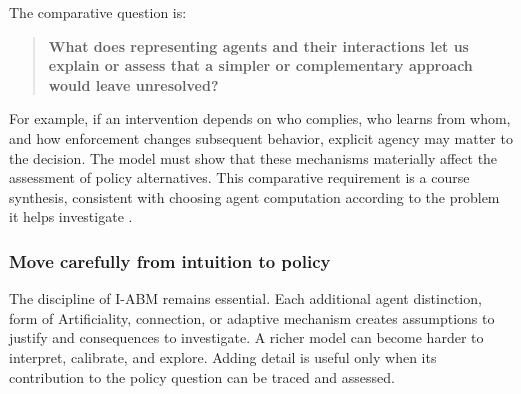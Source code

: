 \documentclass[11pt,a4paper]{article}
\begin{document}
The comparative question is:
\begin{quote}
\textbf{What does representing agents and their interactions let us explain or assess that a simpler or complementary approach would leave unresolved?}
\end{quote}

For example, if an intervention depends on who complies, who learns from whom, and how enforcement changes subsequent behavior, explicit agency may matter to the decision. The model must show that these mechanisms materially affect the assessment of policy alternatives. This comparative requirement is a course synthesis, consistent with choosing agent computation according to the problem it helps investigate \cite{axtell_why_2000-1}.

\subsubsection{Move carefully from intuition to policy}

The discipline of I-ABM remains essential. Each additional agent distinction, form of Artificiality, connection, or adaptive mechanism creates assumptions to justify and consequences to investigate. A richer model can become harder to interpret, calibrate, and explore. Adding detail is useful only when its contribution to the policy question can be traced and assessed.
\end{document}
